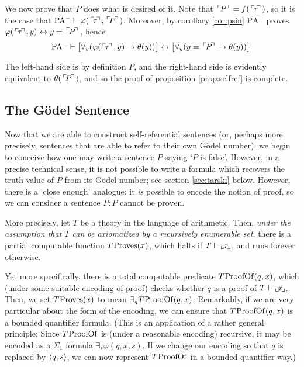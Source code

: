 \documentclass{article}
\theoremstyle{nonumberplain}
\newcommand{\PA}{\mathrm{PA}}
\newcommand{\WPA}{\PA^-}
\DeclareMathOperator{\Proves}{\mspace{-2mu}Proves}
\DeclareMathOperator{\ProofOf}{\mspace{-2mu}ProofOf}
\DeclarePairedDelimiter{\braket}{\langle}{\rangle}
\newcommand{\gn}[1]{\setbox0=\hbox{$\mathclap{\phantom{t}}#1$} \dimen0=\ht0 \advance\dimen0 by -1.25ex \,\raise\dimen0\hbox{$\ulcorner$} \! \box0 \! \raise\dimen0\hbox{$\urcorner$}\,}
\newcommand{\gf}[1]{\raise-0.25ex\hbox{$\llcorner$}\! #1 \!\raise-0.25ex\hbox{$\lrcorner$}}
\begin{document}
We now prove that $P$ does what is desired of it. Note that $\gn P = f(\gn \tau)$, so it is the case that $\WPA \vdash \varphi(\gn\tau, \gn P)$. Moreover, by corollary \ref{cor:psin} $\WPA$ proves $\varphi(\gn\tau, y) \leftrightarrow y=\gn P$, hence
\begin{equation}
\WPA \vdash \big[ \forall_y(\varphi(\gn \tau,y) \rightarrow \theta(y)) \big] \leftrightarrow \big[ \forall_y (y = \gn P \rightarrow \theta(y)) \big].
\end{equation}

The left-hand side is by definition $P$, and the right-hand side is evidently equivalent to $\theta(\gn P)$, and so the proof of proposition \ref{prop:selfref} is complete.

\subsection{The Gödel Sentence}

Now that we are able to construct self-referential sentences (or, perhaps more precisely, sentences that are able to refer to their own Gödel number), we begin to conceive how one may write a sentence $P$ saying `$P$ is false'. However, in a precise technical sense, it is not possible to write a formula which recovers the truth value of $P$ from its Gödel number; see section \ref{sec:tarski} below. However, there is a `close enough' analogue: it \emph{is} possible to encode the notion of proof, so we can consider a sentence $P \colon \text{$P$ cannot be proven}$.

More precisely, let $T$ be a theory in the language of arithmetic. Then, \emph{under the assumption that $T$ can be axiomatized by a recursively enumerable set}, there is a partial computable function $T\Proves(x)$, which halts if $T \vdash \gf x$, and runs forever otherwise.

Yet more specifically, there is a total computable predicate $T\ProofOf(q,x)$, which (under some suitable encoding of proof) checks whether $q$ is a proof of $T \vdash \gf x$. Then, we set $T\Proves(x)$ to mean $\exists_q T\ProofOf(q,x)$. Remarkably, if we are very particular about the form of the encoding, we can ensure that $T\ProofOf(q,x)$ is a bounded quantifier formula. (This is an application of a rather general principle; Since $T\ProofOf$ is (under a reasonable encoding) recursive, it may be encoded as a $\Sigma_1$ formula $\exists_s \varphi(q,x,s)$. If we change our encoding so that $q$ is replaced by $\braket{q,s}$, we can now represent $T\ProofOf$ in a bounded quantifier way.)
\end{document}
